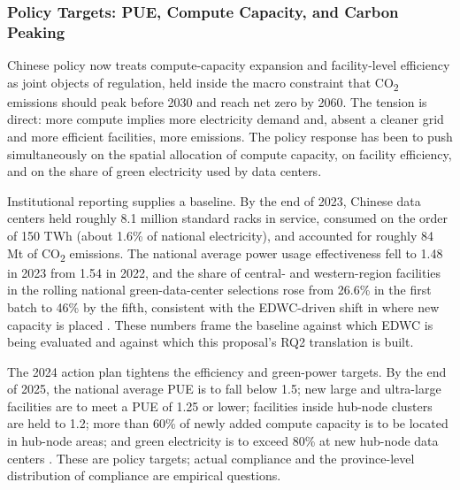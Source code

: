 \documentclass[12pt,a4paper]{article}
\begin{document}
\subsubsection{Policy Targets: PUE, Compute Capacity, and Carbon Peaking}
%
%

Chinese policy now treats compute-capacity expansion and facility-level
efficiency as joint objects of regulation, held inside the macro
constraint that CO\textsubscript{2} emissions should peak before 2030
and reach net zero by 2060. The tension is direct: more compute implies
more electricity demand and, absent a cleaner grid and more efficient
facilities, more emissions. The policy response has been to push
simultaneously on the spatial allocation of compute capacity, on
facility efficiency, and on the share of green electricity used by
data centers.

Institutional reporting supplies a baseline. By the end of 2023,
Chinese data centers held roughly 8.1 million standard racks in
service, consumed on the order of 150 TWh (about 1.6\% of national
electricity), and accounted for roughly 84 Mt of
CO\textsubscript{2} emissions. The national average power usage
effectiveness fell to 1.48 in 2023 from 1.54 in 2022, and the share
of central- and western-region facilities in the rolling national
green-data-center selections rose from 26.6\% in the first batch to
46\% by the fifth, consistent with the EDWC-driven shift in where new
capacity is placed \citep{chinaacademyofinformationandcommunicationstechnologyhoringernewarea-2024-zhongguolusesuanlifazhanyanjiubaogao2024nian}.
These numbers frame the baseline against which EDWC is being evaluated
and against which this proposal's RQ2 translation is built.

The 2024 action plan tightens the efficiency and green-power targets.
By the end of 2025, the national average PUE is to fall below 1.5;
new large and ultra-large facilities are to meet a PUE of 1.25 or
lower; facilities inside hub-node clusters are held to 1.2; more than
60\% of newly added compute capacity is to be located in hub-node
areas; and green electricity is to exceed 80\% at new hub-node data
centers \citep{nationaldevelopmentandreformcommissionetal-2024-shujuzhongxinluseditanfazhanzhuanxiangxingdongjihua}.
These are policy targets; actual compliance and the province-level
distribution of compliance are empirical questions.
\end{document}
